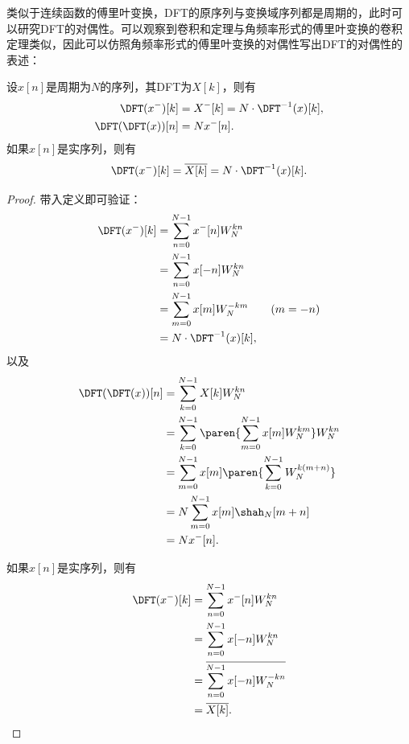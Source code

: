 类似于连续函数的傅里叶变换，DFT的原序列与变换域序列都是周期的，此时可以研究DFT的对偶性。可以观察到卷积和定理与角频率形式的傅里叶变换的卷积定理类似，因此可以仿照角频率形式的傅里叶变换的对偶性写出DFT的对偶性的表述：
\begin{proposition}[离散傅里叶变换的对偶性]\label{prop:DFT_dual}
    设$x[n]$是周期为$N$的序列，其DFT为$X[k]$，则有
    \begin{align}
        \DFT(x^-)[k]&=X^-[k]=N\cdot\DFT^{-1}(x)[k], \\
        \DFT(\DFT(x))[n]&=N x^-[n].
    \end{align}
    如果$x[n]$是实序列，则有
    \begin{equation}
        \DFT(x^-)[k]=\overline{X[k]}=N\cdot\DFT^{-1}(x)[k].
    \end{equation}
\end{proposition}
\begin{proof}
    带入定义即可验证：
    \begin{align}
        \DFT(x^-)[k]&=\sum_{n=0}^{N-1}x^-[n]W_N^{kn} \nonumber \\
        &=\sum_{n=0}^{N-1}x[-n]W_N^{kn} \nonumber \\
        &=\sum_{m=0}^{N-1}x[m]W_N^{-km} \qquad (m=-n) \nonumber \\
        &=N\cdot\DFT^{-1}(x)[k],
    \end{align}
    以及
    \begin{align}
        \DFT(\DFT(x))[n]&=\sum_{k=0}^{N-1}X[k]W_N^{kn} \nonumber \\
        &=\sum_{k=0}^{N-1}\paren{\sum_{m=0}^{N-1}x[m]W_N^{km}}W_N^{kn} \nonumber \\
        &=\sum_{m=0}^{N-1}x[m]\paren{\sum_{k=0}^{N-1}W_N^{k(m+n)}} \nonumber \\
        &=N\sum_{m=0}^{N-1}x[m]\shah_N[m+n] \nonumber \\
        &=N x^-[n].
    \end{align}

    如果$x[n]$是实序列，则有
    \begin{align}
        \DFT(x^-)[k]&=\sum_{n=0}^{N-1}x^-[n]W_N^{kn} \nonumber \\
        &=\sum_{n=0}^{N-1}x[-n]W_N^{kn} \nonumber \\
        &=\overline{\sum_{n=0}^{N-1}x[-n]W_N^{-kn}} \nonumber \\
        &=\overline{X[k]}.
    \end{align}
\end{proof}

